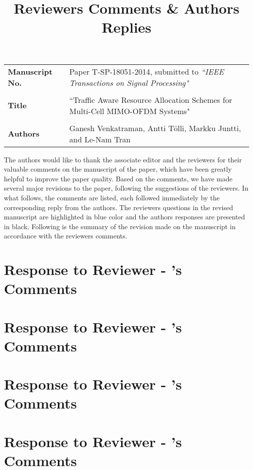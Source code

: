 \documentclass[10pt,letterpaper,onecolumn]{article}
\begin{document}
\usetikzlibrary{plotmarks}
\title{Reviewers Comments \& Authors Replies}

\date{}
\maketitle

\begin{tabular}{p{1.25in}p{4.25in}}
\textbf{Manuscript No.} & Paper T-SP-18051-2014, submitted to \emph{``IEEE Transactions on Signal Processing"} \\ \\
\textbf{Title} & ``Traffic Aware Resource Allocation Schemes for Multi-Cell MIMO-OFDM Systems" \\ \\
\textbf{Authors} & Ganesh Venkatraman, Antti T\"{o}lli, Markku Juntti, and Le-Nam Tran
\end{tabular}

\vspace{0.5in}
The authors would like to thank the associate editor and the reviewers for their valuable comments on the manuscript of the paper, which have been greatly helpful to improve the paper quality. Based on the comments, we have made several major revisions to the paper, following the suggestions of the reviewers. In what follows, the comments are listed, each followed immediately by the corresponding reply from the authors. The reviewers questions in the revised manuscript are highlighted in blue color and the authors responses are presented in black. Following is the summary of the revision made on the manuscript in accordance with the reviewers comments.


\newpage
\section*{Response to Reviewer - 's Comments}


\newpage
\section*{Response to Reviewer - 's Comments}


\newpage
\section*{Response to Reviewer - 's Comments}


\newpage
\section*{Response to Reviewer - 's Comments}

\end{document}
